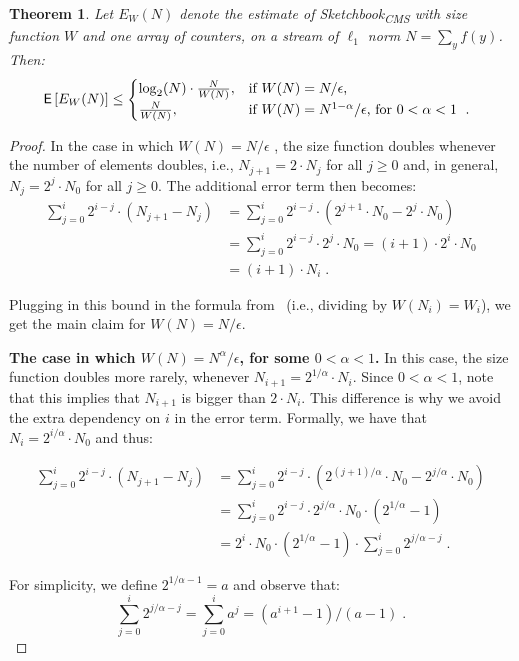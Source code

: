 \documentclass[sigconf]{acmart}
\newtheorem{theorem}{Theorem}[section]
\newcommand{\sketch}{Sketchbook}
\newcommand{\sketchcms}{\sketch\textsubscript{CMS}\xspace}
\begin{document}
\begin{theorem}\label{thm:cms-w} Let $E_W(N)$  denote the estimate of \sketchcms  with size function $W$ and one array of counters, on a stream of $\ell_1$ norm $N = \sum_y f(y)$. Then:
$$\mathsf{E}\left[ E_W(N) \right] \leq  \begin{cases}
	\log_2(N) \cdot \frac{N}{W(N)}, & \text{if $W(N)=N/\epsilon$,}\\
\frac{N}{W(N)}, & \text{if $W(N)=N^{1-\alpha}/\epsilon$, for $0<\alpha < 1$ \;. }
\end{cases}$$
\end{theorem}
\begin{proof}


In the case in which  $W(N) =  N/\epsilon$ , the size function doubles whenever the number of elements doubles, i.e.,  $N_{j+1} = 2 \cdot N_j$ for all $j\geq 0$ and, in general, $N_j = 2^j \cdot N_0$ for all $j\geq 0$. The additional error term then becomes:
\begin{align*}
\sum_{j=0}^i  2^{i-j} \cdot  (N_{j+1} - N_j) & =	\sum_{j=0}^i  2^{i-j} \cdot  (2^{j+1}\cdot N_0 - 2^{j}\cdot N_0)\\
&=  \sum_{j=0}^i  2^{i-j} \cdot  2^j \cdot N_0 = (i+1) \cdot 2^i \cdot N_0\\
&= (i+1) \cdot N_i\;.
\end{align*}	

Plugging in this bound in the formula from~ (i.e., dividing by $W(N_i)=W_i$), we get the main claim for $W(N)=N/\epsilon$. 


\medskip\noindent
\textbf{The case in which $W(N) =  N^{\alpha}/\epsilon$, for some $0< \alpha<1$.} In this case, the size function doubles more rarely, whenever $N_{i+1} = 2^{1/\alpha} \cdot N_i$. Since $0<\alpha<1$, note that this implies that $N_{i+1}$ is bigger than $2\cdot N_i$. This difference is why we avoid the extra dependency on $i$ in the error term. Formally, we have that $N_i = 2^{i/\alpha} \cdot N_0$ and thus:

\begin{align*}
\sum_{j=0}^i  2^{i-j} \cdot  (N_{j+1} - N_j) & =	\sum_{j=0}^i  2^{i-j} \cdot  (2^{(j+1)/\alpha}\cdot N_0 - 2^{j/\alpha}\cdot N_0)\\
&=  \sum_{j=0}^i  2^{i-j} \cdot  2^{j/\alpha} \cdot N_0 \cdot (2^{1/\alpha} -1) \\
&= 2^i \cdot N_0 \cdot (2^{1/\alpha} -1) \cdot   \sum_{j=0}^i   2^{j/\alpha- j}  \;.
\end{align*}	

\noindent
For simplicity, we define $2^{1/\alpha-1} = a$ and observe that:
$$ \sum_{j=0}^i   2^{j/\alpha - j}   =  \sum_{j=0}^i   a^j =  (a^{i+1}-1)/(a-1) \;.   $$


\end{proof}
\end{document}

